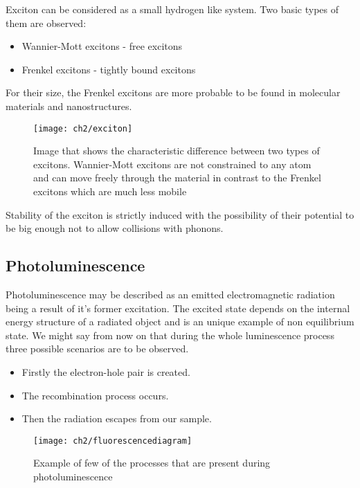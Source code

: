 Exciton can be considered as a small hydrogen like system. Two basic types of them are observed:

\begin{itemize}
\item Wannier-Mott excitons - free excitons
\item Frenkel excitons - tightly bound excitons
\end{itemize}

For their size, the Frenkel excitons are more probable to be found in molecular materials and nanostructures. 

\begin{figure}[H]
\centering
\texttt{[image: ch2/exciton]}
\caption{Image that shows the characteristic difference between two types of excitons. Wannier-Mott excitons are not constrained to any atom and can move freely through the material in contrast to the Frenkel excitons which are much less mobile\cite{fox}}
\end{figure}

Stability of the exciton is strictly induced with the possibility of their potential to be big enough not to allow collisions with phonons.

\subsection{Photoluminescence}

Photoluminescence may be described as an emitted electromagnetic radiation being a result of it's former excitation. The excited state depends on the internal energy structure of a radiated object and is an unique example of non equilibrium state. We might say from now on that during the whole luminescence process three possible scenarios are to be observed. 
\begin{itemize}
\item Firstly the electron-hole pair is created.
\item The recombination process occurs.
\item Then the radiation escapes from our sample.
\end{itemize}

\begin{figure}[H]
\centering
\texttt{[image: ch2/fluorescencediagram]}
\caption{Example of few of the processes that are present during photoluminescence\cite{princeton}}
\end{figure}


